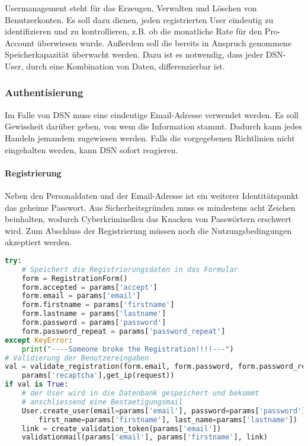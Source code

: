 
Usermanagement steht für das Erzeugen, Verwalten und Löschen von Benutzerkonten. Es soll dazu dienen, jeden registrierten User eindeutig zu identifizieren und zu kontrollieren, z.B. ob die monatliche Rate für den Pro-Account überwiesen wurde. Außerdem soll die bereits in Anspruch genommene Speicherkapazität überwacht werden. Dazu ist es notwendig, dass jeder DSN-User, durch eine Kombination von Daten, differenzierbar ist.
\subsubsection{Authentisierung}
Im Falle von DSN muss eine eindeutige Email-Adresse verwendet werden. Es soll Gewissheit darüber geben, von wem die Information stammt. Dadurch kann jedes Handeln jemandem zugewiesen werden. Falls die vorgegebenen Richtlinien nicht eingehalten werden, kann DSN sofort reagieren.

\paragraph{Registrierung}
Neben den Personaldaten und der Email-Adresse ist ein weiterer Identitätspunkt das geheime Passwort. Aus Sicherheitsgründen muss es mindestens acht Zeichen beinhalten, wodurch Cyberkriminellen das Knacken von Passwörtern erschwert wird. Zum Abschluss der Registrierung müssen noch die Nutzungsbedingungen akzeptiert werden.

\newpage

\begin{lstlisting}[caption={Session Timeout}, language=Python]
try:
	# Speichert die Registrierungsdaten in das Formular
	form = RegistrationForm()
	form.accepted = params['accept']
	form.email = params['email']
	form.firstname = params['firstname']
	form.lastname = params['lastname']
	form.password = params['password']
	form.password_repeat = params['password_repeat']
except KeyError:
	print("----Someone broke the Registration!!!!---")
# Validierung der Benutzereingaben
val = validate_registration(form.email, form.password, form.password_repeat, 
	params['recaptcha'],get_ip(request))
if val is True:
	# der User wird in die Datenbank gespeichert und bekommt 
	# anschliessend eine Bestaetigungsmail
	User.create_user(email=params['email'], password=params['password'], 
		first_name=params['firstname'], last_name=params['lastname'])
	link = create_validation_token(params['email'])
	validationmail(params['email'], params['firstname'], link)
\end{lstlisting}

